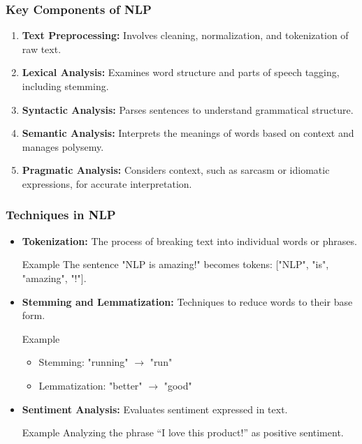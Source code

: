 \documentclass{beamer}
\begin{document}
\begin{frame}[fragile]
    \frametitle{Key Components of NLP}
    \begin{enumerate}
        \item \textbf{Text Preprocessing:} Involves cleaning, normalization, and tokenization of raw text.
        \item \textbf{Lexical Analysis:} Examines word structure and parts of speech tagging, including stemming.
        \item \textbf{Syntactic Analysis:} Parses sentences to understand grammatical structure.
        \item \textbf{Semantic Analysis:} Interprets the meanings of words based on context and manages polysemy.
        \item \textbf{Pragmatic Analysis:} Considers context, such as sarcasm or idiomatic expressions, for accurate interpretation.
    \end{enumerate}
\end{frame}

\begin{frame}[fragile]
    \frametitle{Techniques in NLP}
    \begin{itemize}
        \item \textbf{Tokenization:} 
        The process of breaking text into individual words or phrases.
        \begin{block}{Example}
            The sentence "NLP is amazing!" becomes tokens: ["NLP", "is", "amazing", "!"].
        \end{block}
        
        \item \textbf{Stemming and Lemmatization:} 
        Techniques to reduce words to their base form.
        \begin{block}{Example}
            \begin{itemize}
                \item Stemming: "running" $\to$ "run"
                \item Lemmatization: "better" $\to$ "good"
            \end{itemize}
        \end{block}
        
        \item \textbf{Sentiment Analysis:} 
        Evaluates sentiment expressed in text.
        \begin{block}{Example}
            Analyzing the phrase “I love this product!” as positive sentiment.
        \end{block}
    \end{itemize}
\end{frame}
\end{document}
